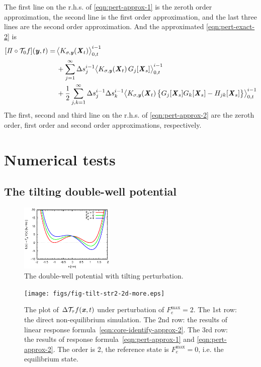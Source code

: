 \documentclass[aip,jcp,a4paper,reprint,onecolumn]{revtex4-1}
\newcommand{\vect}[1]{\textbf{\textit{#1}}}
\newcommand{\mt}{\mathcal T}
\newcommand{\proj}{\mathit\Pi}
\begin{document}
The first line on the r.h.s. of \eqref{eqn:pert-approx-1}
is the zeroth order approximation,  the second line is the
first order approximation, and the last three lines are the
second order approximation.
And the approximated \eqref{eqn:pert-exact-2} is
\begin{align}
  \nonumber
  [\proj\circ\mt_0 f](\vect y, t)
  =&\,
  \big\langle
  K_{\sigma,\vect y}(\vect X_t)
  \big\rangle_{0,t}^{i-1}
  \\ \nonumber
  &\,+
  \sum_{j=1}^\infty
  \Delta s_j^{i-1}
  \big\langle
  K_{\sigma,\vect y}(\vect X_t)\,
  G_j[\vect X_s]
  \big\rangle_{0,t}^{i-1}
  \\\label{eqn:pert-approx-2}
  &\,
  +
  \frac 12
  \sum_{j,k=1}^\infty
  \Delta s_j^{i-1}\Delta s_k^{i-1}
  \big\langle
  K_{\sigma,\vect y}(\vect X_t)\,
  \big\{
  G_j[\vect X_s] G_k[\vect X_s] -
  H_{jk}[\vect X_s]
  \big\}
  \big\rangle_{0,t}^{i-1}  
\end{align}
The first, second and third line on the r.h.s. of \eqref{eqn:pert-approx-2}
are the zeroth order, first order and second order approximations, respectively.









\section{Numerical tests}

\subsection{The tilting double-well potential}

\begin{figure}
  \centering
  \includegraphics[width=0.4\textwidth]{figs/fig-tilt-pot.eps}
  \caption{The double-well potential with tilting perturbation.}
  \label{fig:tmp1}
\end{figure}

\begin{figure}
  \centering
  \texttt{[image: figs/fig-tilt-str2-2d-more.eps]}
  \caption{The plot of $\Delta\mt_\tau f(\vect x,t)$  under perturbation of
    $F_e^{\textrm{max}} = 2$.
    The 1st row: the direct non-equilibrium
    simulation. The 2nd row: the results of linear response
    formula~\eqref{eqn:core-identify-approx-2}.
    The 3rd row: the results of response
    formula~\eqref{eqn:pert-approx-1} and \eqref{eqn:pert-approx-2}.
    The order is 2, the reference state is $F_e^{\textrm{max}} = 0$, i.e.
    the equilibrium state.
  }
  \label{fig:tmp2}
\end{figure}
\end{document}
